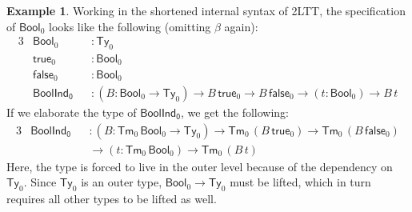 \documentclass[12pt,a4paper,twoside,openany]{book}
\theoremstyle{remark}
\theoremstyle{definition}
\newtheorem{mydefinition}{Definition}
\newtheorem{myexample}{Example}
\newtheorem{mylemma}{Lemma}
\newcommand{\ms}[1]{\mathsf{#1}}
\newcommand{\Sub}{\mathsf{Sub}}
\newcommand{\Tm}{\mathsf{Tm}}
\newcommand{\Ty}{\mathsf{Ty}}
\newcommand{\ext}{\triangleright}
\newcommand{\Bool}{\ms{Bool}}
\newcommand{\true}{\ms{true}}
\newcommand{\false}{\ms{false}}
\begin{document}
\begin{myexample} Working in the shortened internal syntax of 2LTT, the specification of $\Bool_0$
looks like the following (omitting $\beta$ again):
\begin{alignat*}{3}
  &\Bool_0  &&: \Ty_0\\
  &\true_0  &&: \Bool_0\\
  &\false_0 &&: \Bool_0\\
  & \ms{BoolInd_0} &&: (B : \Bool_0 \to \Ty_0) \to B\,\true_0 \to B\,\false_0 \to (t : \Bool_0) \to B\,t
\end{alignat*}
If we elaborate the type of $\ms{BoolInd_0}$, we get the following:
\begin{alignat*}{3}
  & \ms{BoolInd_0} &&: (B : \Tm_0\,\Bool_0 \to \Ty_0) \to \Tm_0\,(B\,\true_0) \to \Tm_0\,(B\,\false_0)\\
  & && \to (t : \Tm_0\,\Bool_0) \to \Tm_0\,(B\,t)
\end{alignat*}
Here, the type is forced to live in the outer level because of the dependency on
$\Ty_0$. Since $\Ty_0$ is an outer type, $\Bool_0 \to \Ty_0$ must be lifted, which
in turn requires all other types to be lifted as well.
\end{myexample}






\end{document}
